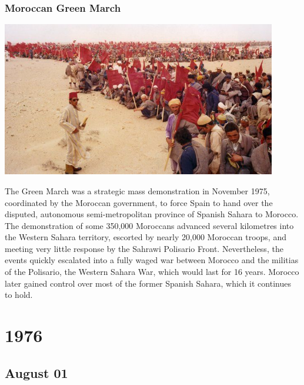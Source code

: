 \documentclass[11pt]{report}
\begin{document}
\subsection{Moroccan Green March}
\vspace{2mm}\begin{center}\includegraphics[width=12cm]{./img/greenmarch.jpg}\end{center}
The Green March was a strategic mass demonstration in November 1975, coordinated by the Moroccan government, to force Spain to hand over the disputed, autonomous semi-metropolitan province of Spanish Sahara to Morocco. The demonstration of some 350,000 Moroccans advanced several kilometres into the Western Sahara territory, escorted by nearly 20,000 Moroccan troops, and meeting very little response by the Sahrawi Polisario Front. Nevertheless, the events quickly escalated into a fully waged war between Morocco and the militias of the Polisario, the Western Sahara War, which would last for 16 years. Morocco later gained control over most of the former Spanish Sahara, which it continues to hold.

\chapter{1976}
\section{August 01}
\end{document}
